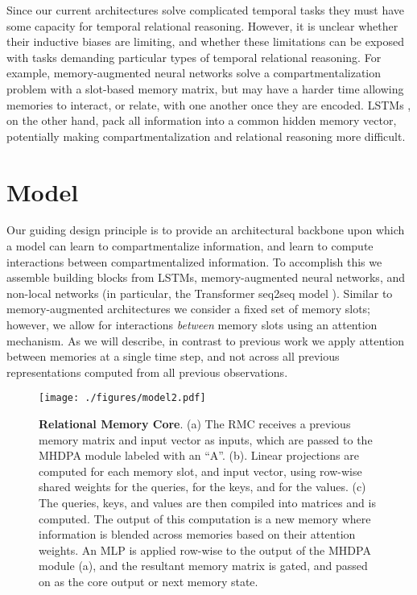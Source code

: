 \documentclass{article}
\begin{document}
Since our current architectures solve complicated temporal tasks they must have some capacity for temporal relational reasoning. However, it is unclear whether their inductive biases are limiting, and whether these limitations can be exposed with tasks demanding particular types of temporal relational reasoning. For example, memory-augmented neural networks \citep{graves2014neural,graves2016hybrid,santoro2016meta,sukhbaatar2015end} solve a compartmentalization problem with a slot-based memory matrix, but may have a harder time allowing memories to interact, or relate, with one another once they are encoded. LSTMs \citep{hochreiter1998lstm, Graves13}, on the other hand, pack all information into a common hidden memory vector, potentially making compartmentalization and relational reasoning more difficult.  \section{Model}
Our guiding design principle is to provide an architectural backbone upon which a model can learn to compartmentalize information, and learn to compute interactions between compartmentalized information. To accomplish this we assemble building blocks from LSTMs, memory-augmented neural networks, and non-local networks (in particular, the Transformer seq2seq model \cite{vaswani2017attention}). Similar to memory-augmented architectures we consider a fixed set of memory slots; however, we allow for interactions \textit{between} memory slots using an attention mechanism. As we will describe, in contrast to previous work we apply attention between memories at a single time step, and not across all previous representations computed from all previous observations.

\begin{figure}
    \centering
    \texttt{[image: ./figures/model2.pdf]}
    \caption{\textbf{Relational Memory Core}. (a) The RMC receives a previous memory matrix and input vector as inputs, which are passed to the MHDPA module labeled with an ``A''. (b). Linear projections are computed for each memory slot, and input vector, using row-wise shared weights  for the queries,  for the keys, and  for the values. (c) The queries, keys, and values are then compiled into matrices and  is computed. The output of this computation is a new memory where information is blended across memories based on their attention weights. An MLP is applied row-wise to the output of the MHDPA module (a), and the resultant memory matrix is gated, and passed on as the core output or next memory state.}
    \label{fig:model}
\end{figure}
\end{document}
